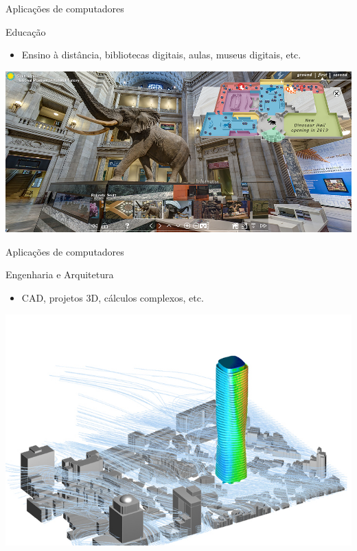 \begin{frame}{Aplicações de computadores}
	\begin{block}{Educação}
		\begin{itemize}
			\item Ensino à distância, bibliotecas digitais, aulas, museus digitais, etc.
		\end{itemize}
	\end{block}

	\bigskip

	\centering
	\includegraphics[width=1\linewidth]{Figuras/Ch01/fig18}
\end{frame}


\begin{frame}{Aplicações de computadores}
	\begin{block}{Engenharia e Arquitetura}
		\begin{itemize}
			\item CAD, projetos 3D, cálculos complexos, etc.
		\end{itemize}
	\end{block}

	\centering
	\includegraphics[width=0.75\linewidth]{Figuras/Ch01/fig19}
\end{frame}


